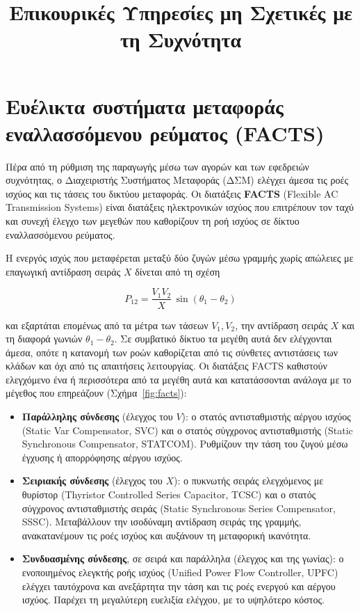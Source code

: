 \title{Επικουρικές Υπηρεσίες μη Σχετικές με τη Συχνότητα}

\section{Ευέλικτα συστήματα μεταφοράς εναλλασσόμενου ρεύματος (FACTS)}
\label{kef-02-theoria}

Πέρα από τη ρύθμιση της παραγωγής μέσω των αγορών και των εφεδρειών συχνότητας, ο Διαχειριστής
Συστήματος Μεταφοράς (ΔΣΜ) ελέγχει άμεσα τις ροές ισχύος και τις τάσεις του δικτύου μεταφοράς. Οι διατάξεις
\textbf{FACTS} (Flexible AC Transmission Systems) είναι διατάξεις ηλεκτρονικών ισχύος που
επιτρέπουν τον ταχύ και συνεχή έλεγχο των μεγεθών που καθορίζουν τη ροή ισχύος σε δίκτυο
εναλλασσόμενου ρεύματος.

Η ενεργός ισχύς που μεταφέρεται μεταξύ δύο ζυγών μέσω γραμμής χωρίς απώλειες με επαγωγική
αντίδραση σειράς $X$ δίνεται από τη σχέση

\begin{equation}
P_{12} = \frac{V_1 V_2}{X}\,\sin(\theta_1 - \theta_2)
\label{eq:facts-powerflow}
\end{equation}

και εξαρτάται επομένως από τα μέτρα των τάσεων $V_1, V_2$, την αντίδραση σειράς $X$ και τη
διαφορά γωνιών $\theta_1 - \theta_2$. Σε
συμβατικό δίκτυο τα μεγέθη αυτά δεν ελέγχονται άμεσα, οπότε η κατανομή των ροών καθορίζεται
από τις σύνθετες αντιστάσεις των κλάδων και όχι από τις απαιτήσεις λειτουργίας. Οι διατάξεις
FACTS καθιστούν ελεγχόμενο ένα ή περισσότερα από τα μεγέθη αυτά και κατατάσσονται ανάλογα με
το μέγεθος που επηρεάζουν (Σχήμα~\ref{fig:facts}):

\begin{itemize}
\item \textbf{Παράλληλης σύνδεσης} (έλεγχος του $V$): ο στατός αντισταθμιστής αέργου ισχύος
      (Static Var Compensator, SVC) και ο στατός σύγχρονος αντισταθμιστής (Static
      Synchronous Compensator, STATCOM). Ρυθμίζουν την τάση του ζυγού μέσω έγχυσης ή
      απορρόφησης αέργου ισχύος.
\item \textbf{Σειριακής σύνδεσης} (έλεγχος του $X$): ο πυκνωτής σειράς ελεγχόμενος με
      θυρίστορ (Thyristor Controlled Series Capacitor, TCSC) και ο στατός σύγχρονος
      αντισταθμιστής σειράς (Static Synchronous Series Compensator, SSSC). Μεταβάλλουν την
      ισοδύναμη αντίδραση σειράς της γραμμής, ανακατανέμουν τις ροές ισχύος και αυξάνουν τη
      μεταφορική ικανότητα.
\item \textbf{Συνδυασμένης σύνδεσης}, σε σειρά και παράλληλα (έλεγχος και της γωνίας): ο
      ενοποιημένος ελεγκτής ροής ισχύος (Unified Power Flow Controller, UPFC) ελέγχει
      ταυτόχρονα και ανεξάρτητα την τάση και τις ροές ενεργού και αέργου ισχύος. Παρέχει τη
      μεγαλύτερη ευελιξία ελέγχου, με το υψηλότερο κόστος.
\end{itemize}

